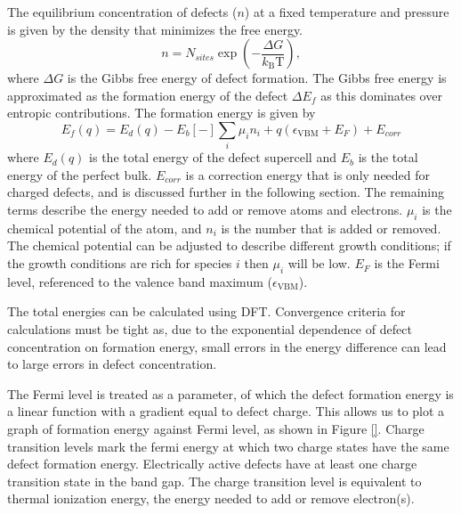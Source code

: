 The equilibrium concentration of defects ($n$) at a fixed temperature and pressure is given by the density that minimizes the free energy.
\begin{equation} \label{defectconcentration}
    n = N_{sites} \exp \left(-\frac{\Delta G}{k_\mathrm{B} \mathrm{T}} \right),
\end{equation}
where $\Delta G$ is the Gibbs free energy of defect formation. The Gibbs free energy is approximated as the formation energy of the defect $\Delta E_f$ as this dominates over entropic contributions. The formation energy is given by
\begin{equation} \label{eqn_formation_energy}
E_f(q) = E_d(q) - E_b [-] \sum_i \mu_i n_i + q(\epsilon_\mathrm{VBM}+E_F) + E_{corr}
\end{equation}
where $E_d(q)$ is the total energy of the defect supercell and $E_b$ is the total energy of the perfect bulk. 
$E_{corr}$ is a correction energy that is only needed for charged defects, and is discussed further in the following section.
The remaining terms describe the energy needed to add or remove atoms and electrons.
$\mu_i$ is the chemical potential of the atom, and $n_i$ is the number that is added or removed.
The chemical potential can be adjusted to describe different growth conditions; if the growth conditions are rich for species $i$ then $\mu_i$ will be low.
$E_F$ is the Fermi level, referenced to the valence band maximum ($\epsilon_\mathrm{VBM}$).

The total energies can be calculated using DFT. Convergence criteria for calculations must be tight as, due to the exponential dependence of defect concentration on formation energy, small errors in the energy difference can lead to large errors in defect concentration.

The Fermi level is treated as a parameter, of which the defect formation energy is a linear function with a gradient equal to defect charge. This allows us to plot a graph of formation energy against Fermi level, as shown in Figure \ref{}. Charge transition levels mark the fermi energy at which two charge states have the same defect formation energy. Electrically active defects have at least one charge transition state in the band gap. 
The charge transition level is equivalent to thermal ionization energy, the energy needed to add or remove electron(s). %

